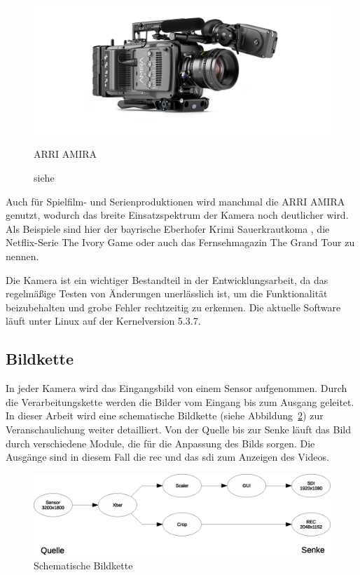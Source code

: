 \begin{figure}[!hbtp]
	\centering
	\includegraphics[width = 0.7\linewidth]{pictures/amira-product-image-data.jpg}
	\hspace*{0\textwidth}
	\caption{ARRI AMIRA}
	\caption*{siehe \cite{arriamira_bild}}
	\label{fig:amira}
\end{figure}  

Auch für Spielfilm- und Serienproduktionen wird  manchmal die \ac{ARRI} AMIRA genutzt, wodurch das breite Einsatzspektrum der Kamera noch deutlicher wird.
Als Beispiele sind hier der bayrische Eberhofer Krimi \glqq Sauerkrautkoma\grqq{} \cite{arrikrimi}, die Netflix-Serie \glqq The Ivory Game\grqq{} \cite{imdbivory} oder auch das Fernsehmagazin \glqq The Grand Tour\grqq{} \cite{imdbtour} zu nennen.
 
Die Kamera ist ein wichtiger Bestandteil in der Entwicklungsarbeit, da das regelmäßige Testen von Änderungen unerlässlich ist, um die Funktionalität beizubehalten und grobe Fehler rechtzeitig zu erkennen. Die aktuelle Software läuft unter Linux auf der Kernelversion 5.3.7.

\subsection{Bildkette}\label{sec:bildkette}
In jeder Kamera wird das Eingangsbild von einem Sensor aufgenommen. Durch die Verarbeitungskette werden die Bilder vom Eingang bis zum Ausgang geleitet. In dieser Arbeit wird eine schematische Bildkette (siehe Abbildung~\ref{fig:bild}) zur Veranschaulichung weiter detailliert. Von der Quelle bis zur Senke läuft das Bild durch verschiedene Module, die für die Anpassung des Bilds sorgen. Die Ausgänge sind in diesem Fall die \ac{rec} und das \ac{sdi} zum Anzeigen des Videos.

\begin{figure}[!hbtp]
	\centering
	\includegraphics[width = \linewidth]{pictures/2020-01-16_Bildkette.eps}
	\smallskip
	\caption{Schematische Bildkette}
	\label{fig:bild}
\end{figure} 


